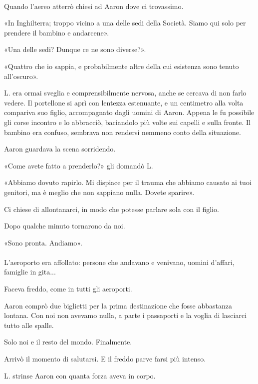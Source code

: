 \documentclass[a4paper,12pt]{book}
\begin{document}
\paragraph{}
Quando l'aereo atterrò chiesi ad Aaron dove ci trovassimo.

«In Inghilterra; troppo vicino a una delle sedi della Società. Siamo qui solo
per prendere il bambino e andarcene».

«Una delle sedi? Dunque ce ne sono diverse?».

«Quattro che io sappia, e probabilmente altre della cui esistenza sono tenuto
all'oscuro».

L. era ormai sveglia e comprensibilmente nervosa, anche se cercava di non farlo
vedere. Il portellone si aprì con lentezza estenuante, e un centimetro alla
volta compariva suo figlio, accompagnato dagli uomini di Aaron. Appena le fu
possibile gli corse incontro e lo abbracciò, baciandolo più volte sui capelli e
sulla fronte. Il bambino era confuso, sembrava non rendersi nemmeno conto della
situazione.

Aaron guardava la scena sorridendo.

«Come avete fatto a prenderlo?» gli domandò L.

«Abbiamo dovuto rapirlo. Mi dispiace per il trauma che abbiamo causato ai tuoi
genitori, ma è meglio che non sappiano nulla. Dovete sparire».

Ci chiese di allontanarci, in modo che potesse parlare sola con il figlio.

Dopo qualche minuto tornarono da noi.

«Sono pronta. Andiamo».

\paragraph{}
L'aeroporto era affollato: persone che andavano e venivano, uomini d'affari,
famiglie in gita...

Faceva freddo, come in tutti gli aeroporti.

Aaron comprò due biglietti per la prima destinazione che fosse abbastanza
lontana. Con noi non avevamo nulla, a parte i passaporti e la voglia di
lasciarci tutto alle spalle.

Solo noi e il resto del mondo. Finalmente.

Arrivò il momento di salutarsi. E il freddo parve farsi più intenso.

L. strinse Aaron con quanta forza aveva in corpo.
\end{document}
